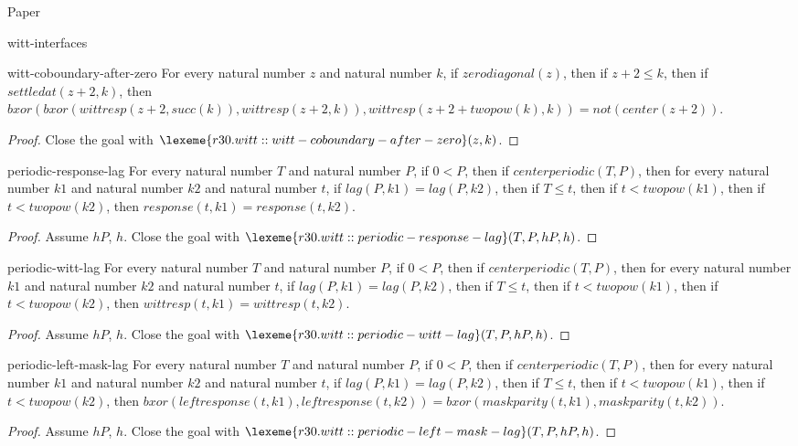 \begin{lexlean}{Paper}
\begin{section}{witt-interfaces}
  \begin{theorem}{witt-coboundary-after-zero}
  For every natural number \(z\) and natural number \(k\), if \(zerodiagonal(z)\), then if \(z + 2 ≤ k\), then if \(settledat(z + 2, k)\), then \(bxor(bxor(wittresp(z + 2, succ(k)), wittresp(z + 2, k)), wittresp(z + 2 + twopow(k), k)) = not(center(z + 2))\).
  \begin{proof}
  Close the goal with \(\lexeme{r30.witt::witt-coboundary-after-zero}(z, k)\).
  \end{proof}
  \end{theorem}

  \begin{theorem}{periodic-response-lag}
  For every natural number \(T\) and natural number \(P\), if \(0 < P\), then if \(centerperiodic(T, P)\), then for every natural number \(k1\) and natural number \(k2\) and natural number \(t\), if \(lag(P, k1) = lag(P, k2)\), then if \(T ≤ t\), then if \(t < twopow(k1)\), then if \(t < twopow(k2)\), then \(response(t, k1) = response(t, k2)\).
  \begin{proof}
  Assume \(hP\), \(h\).
  Close the goal with \(\lexeme{r30.witt::periodic-response-lag}(T, P, hP, h)\).
  \end{proof}
  \end{theorem}

  \begin{theorem}{periodic-witt-lag}
  For every natural number \(T\) and natural number \(P\), if \(0 < P\), then if \(centerperiodic(T, P)\), then for every natural number \(k1\) and natural number \(k2\) and natural number \(t\), if \(lag(P, k1) = lag(P, k2)\), then if \(T ≤ t\), then if \(t < twopow(k1)\), then if \(t < twopow(k2)\), then \(wittresp(t, k1) = wittresp(t, k2)\).
  \begin{proof}
  Assume \(hP\), \(h\).
  Close the goal with \(\lexeme{r30.witt::periodic-witt-lag}(T, P, hP, h)\).
  \end{proof}
  \end{theorem}

  \begin{theorem}{periodic-left-mask-lag}
  For every natural number \(T\) and natural number \(P\), if \(0 < P\), then if \(centerperiodic(T, P)\), then for every natural number \(k1\) and natural number \(k2\) and natural number \(t\), if \(lag(P, k1) = lag(P, k2)\), then if \(T ≤ t\), then if \(t < twopow(k1)\), then if \(t < twopow(k2)\), then \(bxor(leftresponse(t, k1), leftresponse(t, k2)) = bxor(maskparity(t, k1), maskparity(t, k2))\).
  \begin{proof}
  Assume \(hP\), \(h\).
  Close the goal with \(\lexeme{r30.witt::periodic-left-mask-lag}(T, P, hP, h)\).
  \end{proof}
  \end{theorem}


\end{section}
\end{lexlean}
